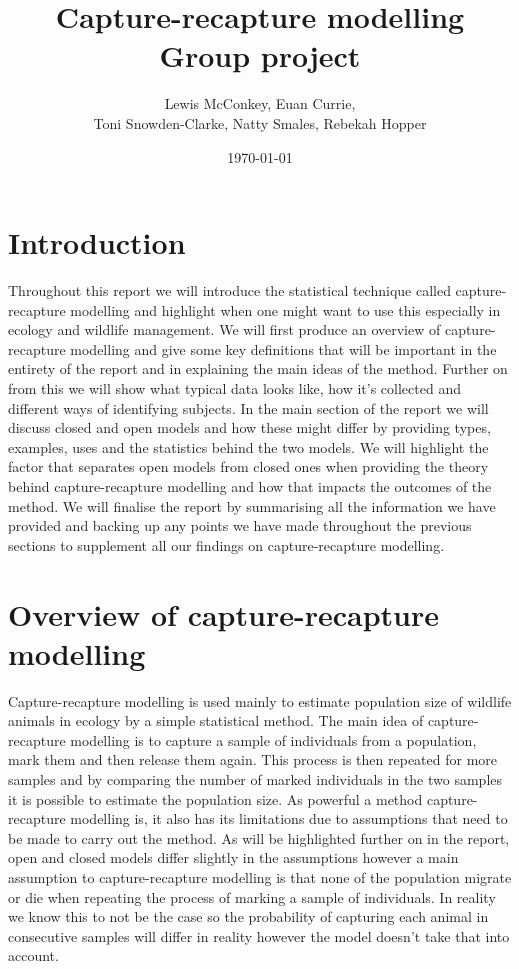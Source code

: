 \documentclass[,oneside]{article}
\author{Lewis McConkey, Euan Currie, \\ Toni Snowden-Clarke, Natty Smales, Rebekah Hopper}
\date{\today}
\title{ \LARGE{Capture-recapture modelling} \\
          \hspace{16cm}Group project}
\numberwithin{equation}{section}
\begin{document}
\maketitle
 \begin{abstract} 

 \end{abstract}
 \section{\large{Introduction}}
 Throughout this report we will introduce the statistical technique called capture-recapture modelling and highlight when one might want to use this especially in ecology and wildlife management. We will first produce an overview of capture-recapture modelling and give some key definitions that will be important in the entirety of the report and in explaining the main ideas of the method. Further on from this we will show what typical data looks like, how it’s collected and different ways of identifying subjects. In the main section of the report we will discuss closed and open models and how these might differ by providing types, examples, uses and the statistics behind the two models. We will highlight the factor that separates open models from closed ones when providing the theory behind capture-recapture modelling and how that impacts the outcomes of the method. We will finalise the report by summarising all the information we have provided and backing up any points we have made throughout the previous sections to supplement all our findings on capture-recapture modelling. 
 
 
\section{\large{Overview of capture-recapture modelling}} 
Capture-recapture modelling is used mainly to estimate population size of wildlife animals in ecology by a simple statistical method. The main idea of capture-recapture modelling is to capture a sample of individuals from a population, mark them and then release them again. This process is then repeated for more samples and by comparing the number of marked individuals in the two samples it is possible to estimate the population size. As powerful a method capture-recapture modelling is, it also has its limitations due to assumptions that need to be made to carry out the method. As will be highlighted further on in the report, open and closed models differ slightly in the assumptions however a main assumption to capture-recapture modelling is that none of the population migrate or die when repeating the process of marking a sample of individuals. In reality we know this to not be the case so the probability of capturing each animal in consecutive samples will differ in reality however the model doesn’t take that into account. 
\end{document}
